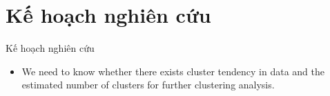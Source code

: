 \section{Kế hoạch nghiên cứu}\label{sec:intro}
\frame{\tableofcontents[currentsection]}
\begin{frame}{Kế hoạch nghiên cứu}

\begin{itemize}
    \item <1-> We need to know whether there exists cluster tendency in data and the estimated number of clusters for further clustering analysis.
\end{itemize}
\end{frame}
